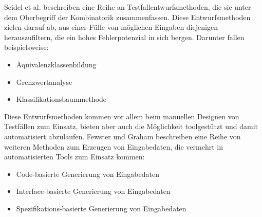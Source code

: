 Seidel et al. \cite[vgl. S. 27]{seidl_basiswissen_2012} beschreiben eine Reihe an Testfallentwurfsmethoden, die sie unter dem Oberbegriff der Kombinatorik zusammenfassen. Diese Entwurfsmethoden zielen darauf ab, aus einer Fülle von möglichen Eingaben diejenigen herauszufiltern, die ein hohes Fehlerpotenzial in sich bergen. Darunter fallen beispielsweise:
\begin{itemize}
\item Äquivalenzklassenbildung
\item Grenzwertanalyse
\item Klassifikationsbaummethode
\end{itemize}
Diese Entwurfsmethoden kommen vor allem beim manuellen Designen von Testfällen zum Einsatz, bieten aber auch die Möglichkeit toolgestützt und damit automatisiert abzulaufen.
Fewster und Graham \cite[vgl. S. 19 ff.]{fewster_software_1999} beschreiben eine Reihe von weiteren Methoden zum Erzeugen von Eingabedaten, die vermehrt in automatisierten Tools zum Einsatz kommen:
\begin{itemize}
\item Code-basierte Generierung von Eingabedaten
\item Interface-basierte Generierung von Eingabedaten
\item Spezifikations-basierte Generierung von Eingabedaten
\end{itemize}

